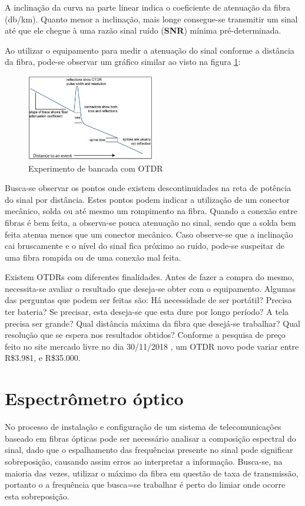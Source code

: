 \documentclass[article]{IEEEtran}
\begin{document}
A inclinação da curva na parte linear indica o coeficiente de atenuação da fibra (db/km). Quanto menor a inclinação, mais longe consegue-se transmitir um sinal até que ele chegue à uma razão sinal ruído (\textbf{SNR}) mínima pré-determinada.

Ao utilizar o equipamento para medir a atenuação do sinal conforme a distância da fibra, pode-se observar um gráfico similar ao visto na figura \ref{fig:OTDR_grafico}:
\begin{figure}[H]
	\includegraphics[width=0.5\textwidth]{images/OTDR_grafico.JPG}
	\caption{Experimento de bancada com OTDR}
	\label{fig:OTDR_grafico}
\end{figure} 

Busca-se observar os pontos onde existem descontinuidades na reta de potência do sinal por distância. Estes pontos podem indicar a utilização de um conector mecânico, solda ou até mesmo um rompimento na fibra. Quando a conexão entre fibras é bem feita, a observa-se pouca atenuação no sinal, sendo que a solda bem feita atenua menos que um conector mecânico. Caso observe-se que a inclinação cai bruscamente e o nível do sinal fica próximo ao ruído, pode-se suspeitar de uma fibra rompida ou de uma conexão mal feita.

Existem OTDRs com diferentes finalidades. Antes de fazer a compra do mesmo, necessita-se avaliar o resultado que deseja-se obter com o equipamento. Algumas das perguntas que podem ser feitas são: Há necessidade de ser portátil? Precisa ter bateria? Se precisar, esta deseja-se que esta dure por longo período? A tela precisa ser grande? Qual distância máxima da fibra que desejá-se trabalhar? Qual resolução que se espera nos resultados obtidos? Conforme a pesquisa de preço feito no site mercado livre no dia 30/11/2018 \cite{M_LIVRE}, um OTDR novo pode variar entre R\$3.981, e R\$35.000.

\section{Espectrômetro óptico}
No processo de instalação e configuração de um sistema de telecomunicações baseado em fibras ópticas pode ser necessário analisar a composição espectral do sinal, dado que o espalhamento das frequências presente no sinal pode significar sobreposição, causando assim erros ao interpretar a informação. Busca-se, na maioria das vezes, utilizar o máximo da fibra em questão de taxa de transmissão, portanto o a frequência que busca=se trabalhar é perto do limiar onde ocorre esta sobreposição.
 
\end{document}
